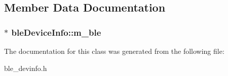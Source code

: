 \subsection{Member Data Documentation}
\hypertarget{classble_device_info_a12a144e14c48090240505c6be43c6eac}{
\subsubsection[{m\-\_\-ble}]{$\ast$ ble\-Device\-Info\-::m\-\_\-ble\hspace{0.3cm}{\ttfamily [protected]}}}\label{classble_device_info_a12a144e14c48090240505c6be43c6eac}


The documentation for this class was generated from the following file\-:\begin{DoxyCompactItemize}
\item 
ble\-\_\-devinfo.\-h\end{DoxyCompactItemize}
